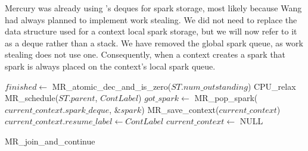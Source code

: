 
Mercury was already using \citet{Chase_2005_wsdeque}'s deques for spark
storage,
most likely because Wang had always planned to implement work stealing.
We did not need to replace the data structure used for a context local
spark storage,
but we will now refer to it as a deque rather than a stack.
We have removed the global spark queue,
as work stealing does not use one.
Consequently,
when a context creates a spark that spark is always placed on the
context's local spark queue.

\begin{algorithm}
\begin{algorithmic}[1]
  \State $finished \gets$ MR\_atomic\_dec\_and\_is\_zero($ST.num\_outstanding$)
    \Else
        \State CPU\_relax
      \EndWhile
      \State MR\_schedule($ST.parent$, $ContLabel$)
    \EndIf
  \Else
    \State $got\_spark \gets$ MR\_pop\_spark($current\_context.spark\_deque$,
        \&$spark$)
    \Else
         \State MR\_save\_context($current\_context$)
         \State $current\_context.resume\_label \gets ContLabel$
         \State $current\_context \gets$ NULL
      \EndIf
    \EndIf
  \EndIf
\EndProcedure
\end{algorithmic}
\caption{MR\_join\_and\_continue}
\label{alg:join_and_continue_ws1}
\end{algorithm}

